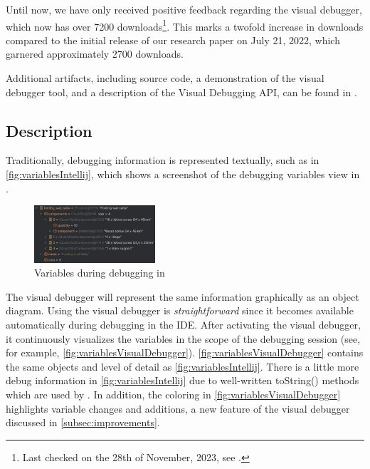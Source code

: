 \documentclass[sigconf]{acmart}
\begin{document}
Until now, we have only received positive feedback regarding the visual debugger, which now has over 7200 downloads\footnote{Last checked on the 28th of November, 2023, see \cite{timkrauterVisualDebuggerIntelliJ2023}.}.
This marks a twofold increase in downloads compared to the initial release of our research paper \cite{krauterVisualDebuggerTool2022} on July 21, 2022, which garnered approximately 2700 downloads.

Additional artifacts, including source code, a demonstration of the visual debugger tool, and a description of the Visual Debugging API, can be found in \cite{timkrauterICSE2024Artifacts2023}.

\subsection{Description}

Traditionally, debugging information is represented textually, such as in \autoref{fig:variablesIntellij}, which shows a screenshot of the debugging variables view in \intellij.

\begin{figure}[h]
    \centering
    \includegraphics[width=0.4\textwidth]{images/variables.png}
    \caption{Variables during debugging in \intellij}
    \label{fig:variablesIntellij}
\end{figure}

The visual debugger will represent the same information graphically as an object diagram.
Using the visual debugger is \textit{straightforward} since it becomes available automatically during debugging in the IDE.
After activating the visual debugger, it continuously visualizes the variables in the scope of the debugging session (see, for example, \autoref{fig:variablesVisualDebugger}).
\autoref{fig:variablesVisualDebugger} contains the same objects and level of detail as \autoref{fig:variablesIntellij}.
There is a little more debug information in \autoref{fig:variablesIntellij} due to well-written \textsf{toString()} methods which are used by \intellij{}.
In addition, the coloring in \autoref{fig:variablesVisualDebugger} highlights variable changes and additions, a new feature of the visual debugger discussed in \autoref{subsec:improvements}.
\end{document}
